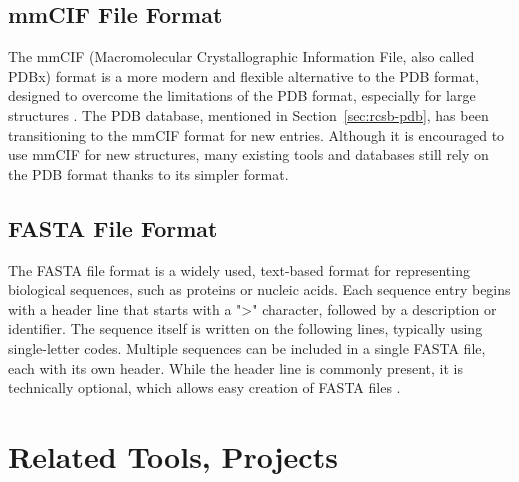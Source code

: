 \begin{figure}[H]
    \centering
    
\end{figure}


\subsection{mmCIF File Format}
\label{sec:mmcif-format}

The mmCIF (Macromolecular Crystallographic Information File, also called PDBx) format is a more modern and flexible alternative to the PDB format, designed to overcome the limitations of the PDB format, especially for large structures \cite{bourne199730}. The PDB database, mentioned in Section~\ref{sec:rcsb-pdb}, has been transitioning to the mmCIF format for new entries. Although it is encouraged to use mmCIF for new structures, many existing tools and databases still rely on the PDB format thanks to its simpler format.

\subsection{FASTA File Format}
\label{sec:fasta-format}

The FASTA file format is a widely used, text-based format for representing biological sequences, such as proteins or nucleic acids. Each sequence entry begins with a header line that starts with a ">" character, followed by a description or identifier. The sequence itself is written on the following lines, typically using single-letter codes. Multiple sequences can be included in a single FASTA file, each with its own header. While the header line is commonly present, it is technically optional, which allows easy creation of FASTA files \cite{lipman1985rapid}.

\begin{figure}[H]
    \centering
    
\end{figure}

\section{Related Tools, Projects}
\label{sec:related-tools}

